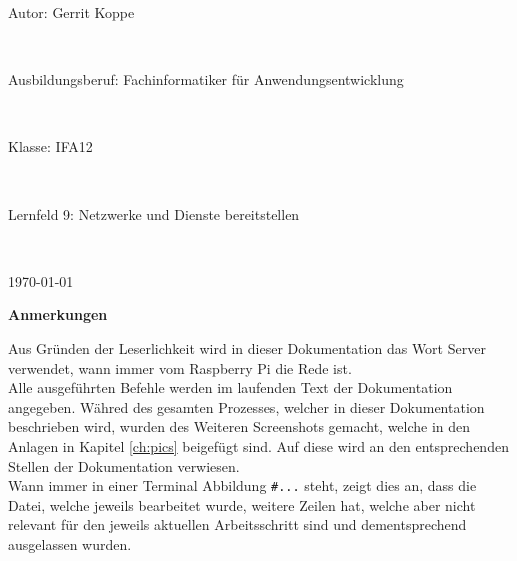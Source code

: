 \documentclass[a4paper, 11pt]{scrartcl}
\begin{document}
\begin{center}
    \vspace{0.1\textheight}
    \begin{Large}
        Autor: Gerrit Koppe
    \end{Large}
    \\
    \vspace{0.5cm}
    \begin{Large}
        Ausbildungsberuf: Fachinformatiker für Anwendungsentwicklung
    \end{Large}
    \\
    \vspace{0.5cm}
    \begin{Large}
        Klasse: IFA12
    \end{Large}
    \\
    \vspace{0.5cm}
    \begin{Large}
        Lernfeld 9: Netzwerke und Dienste bereitstellen
    \end{Large}
    \\
    \vspace{0.5cm}
    \begin{Large}
        \today
    \end{Large}
\end{center}
\newpage
\thispagestyle{empty}
\begin{Large}
    \begin{flushleft}
        \textbf{\textcolor{BBS}{Anmerkungen}}
    \end{flushleft}
\end{Large}
Aus Gründen der Leserlichkeit wird in dieser Dokumentation das Wort \glqq Server\grqq{} verwendet, wann immer vom Raspberry Pi die Rede ist.
\\
Alle ausgeführten Befehle werden im laufenden Text der Dokumentation angegeben. Währed des gesamten Prozesses, welcher in dieser Dokumentation beschrieben wird, wurden des Weiteren Screenshots
gemacht, welche in den Anlagen in Kapitel \ref{ch:pics} beigefügt sind. Auf diese wird an den entsprechenden Stellen der Dokumentation verwiesen.
\\
Wann immer in einer Terminal Abbildung \glqq\lstinline[basicstyle={\small\ttfamily\color{black}}]|#...|\grqq{} steht, zeigt dies an, dass die Datei, welche jeweils bearbeitet wurde,
weitere Zeilen hat, welche aber nicht relevant für den jeweils aktuellen Arbeitsschritt sind und dementsprechend ausgelassen wurden.

\newpage
\thispagestyle{empty}
\tableofcontents
\newpage
\clearpage
{}
\end{document}
